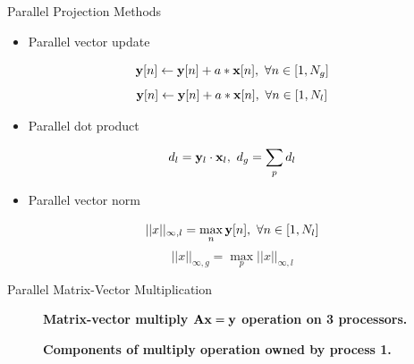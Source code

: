 \documentclass{beamer}
\begin{document}
\begin{frame}{Parallel Projection Methods}
  
  \begin{itemize}
  \item Parallel vector update
  \end{itemize}
  \[
  \mathbf{y}[n] \leftarrow \mathbf{y}[n] + a * \mathbf{x}[n],\ \forall n \in
     [1,N_g]
  \]
  \[
  \mathbf{y}[n] \leftarrow \mathbf{y}[n] + a * \mathbf{x}[n],\ \forall n \in
     [1,N_l]
  \]
  
  \begin{itemize}
  \item Parallel dot product
  \end{itemize}
  \[
  d_l = \mathbf{y}_l \cdot \mathbf{x}_l,\ d_g = \sum_p d_l
  \]

  \begin{itemize}
  \item Parallel vector norm
  \end{itemize}
  \[
  ||x||_{\infty,l} = \max_n \ve{y}[n],\ \forall n \in [1,N_l]
  \]
  \[
  ||x||_{\infty,g} = \max_p ||x||_{\infty,l}
  \]
  
\end{frame}

\begin{frame}{Parallel Matrix-Vector Multiplication}

  \begin{figure}[htpb!]
    \begin{center}
      \scalebox{0.6}{  }
    \end{center}
    \caption{\textbf{Matrix-vector multiply $\mathbf{A}\mathbf{x}=\mathbf{y}$
        operation on 3 processors.}
      \label{fig:partitioned_matvec_multiply} }
  \end{figure}

  \pause
  \begin{figure}[htpb!]
    \begin{center}
      \scalebox{0.7}{  }
    \end{center}
    \caption{\textbf{Components of multiply operation owned by process
        1.} }
    \label{fig:matvec_proc_1}
  \end{figure}

\end{frame}
\end{document}
